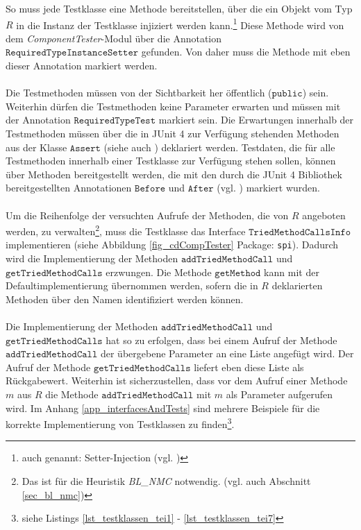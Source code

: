 \noindent
So muss jede Testklasse eine Methode bereitstellen, über die ein Objekt vom Typ $R$ in die Instanz der Testklasse injiziert werden kann.\footnote{auch genannt: Setter-Injection (vgl. \cite{setterinjection})} Diese Methode wird von dem \emph{ComponentTester}-\Gls{Modul} über die Annotation $\texttt{RequiredTypeInstanceSetter}$ gefunden. Von daher muss die Methode mit eben dieser Annotation markiert werden.
\\\\
Die Testmethoden müssen von der Sichtbarkeit her öffentlich ($\texttt{public}$) sein. Weiterhin dürfen die Testmethoden keine Parameter erwarten und müssen mit der Annotation $\texttt{RequiredTypeTest}$ markiert sein. Die Erwartungen innerhalb der Testmethoden müssen über die in JUnit 4 zur Verfügung stehenden Methoden aus der Klasse $\texttt{Assert}$ (siehe auch \cite{junit_api}) deklariert werden. Testdaten, die für alle Testmethoden innerhalb einer Testklasse zur Verfügung stehen sollen, können über Methoden bereitgestellt werden, die mit den durch die JUnit 4 Bibliothek bereitgestellten Annotationen $\texttt{Before}$ und $\texttt{After}$ (vgl. \cite{junit_api}) markiert wurden.
\\\\
Um die Reihenfolge der versuchten Aufrufe der Methoden, die von $R$ angeboten werden, zu verwalten\footnote{Das ist für die Heuristik \emph{BL\_NMC} notwendig. (vgl. auch Abschnitt \ref{sec_bl_nmc})}, muss die Testklasse das \Gls{Interface} $\texttt{TriedMethodCallsInfo}$ implementieren (siehe Abbildung \ref{fig_cdCompTester} Package: \texttt{spi}). Dadurch wird die Implementierung der Methoden $\texttt{addTriedMethodCall}$ und $\texttt{getTriedMethodCalls}$ erzwungen. Die Methode $\texttt{getMethod}$ kann mit der Defaultimplementierung übernommen werden, sofern die in $R$ deklarierten Methoden über den Namen identifiziert werden können.
\\\\
Die Implementierung der Methoden $\texttt{addTriedMethodCall}$ und $\texttt{getTriedMethodCalls}$ hat so zu erfolgen, dass bei einem Aufruf der Methode $\texttt{addTriedMethodCall}$ der übergebene Parameter an eine Liste angefügt wird. Der Aufruf der Methode $\texttt{getTriedMethodCalls}$ liefert eben diese Liste als Rückgabewert. Weiterhin ist sicherzustellen, dass vor dem Aufruf einer Methode $m$ aus $R$ die Methode $\texttt{addTriedMethodCall}$ mit $m$ als Parameter aufgerufen wird. Im Anhang \ref{app_interfacesAndTests} sind mehrere Beispiele für die korrekte Implementierung von Testklassen zu finden\footnote{siehe Listings \ref{lst_testklassen_tei1} - \ref{lst_testklassen_tei7}}.
